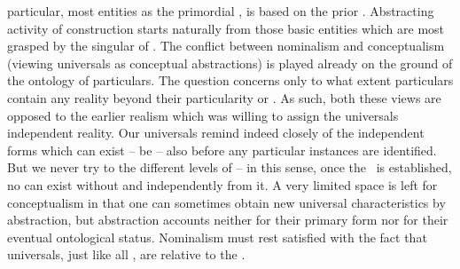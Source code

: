 \pa {} particular, most  entities as the primordial
, is based on the prior .
Abstracting activity of  construction starts naturally from those
basic entities which are most  grasped by the singular 
of .  The conflict between nominalism and conceptualism (viewing
universals as conceptual abstractions) is played already on the ground of the
ontology of particulars. The question concerns only to what extent particulars
contain any reality beyond their particularity or . As such,
both these views are opposed to the earlier realism which was willing to assign
the universals independent reality. Our universals remind indeed closely of the
independent forms which can exist -- be  -- also before any
particular instances are identified. But we never try to  the
different levels of  -- in this sense, once the \hoa\ is
established, no  can exist without and independently from it.
A very limited space is left for conceptualism in that one can sometimes obtain
new universal characteristics by abstraction, but abstraction accounts neither
for their primary form nor for their eventual ontological status. Nominalism
must rest satisfied with the fact that universals, just like all , are relative to the .



